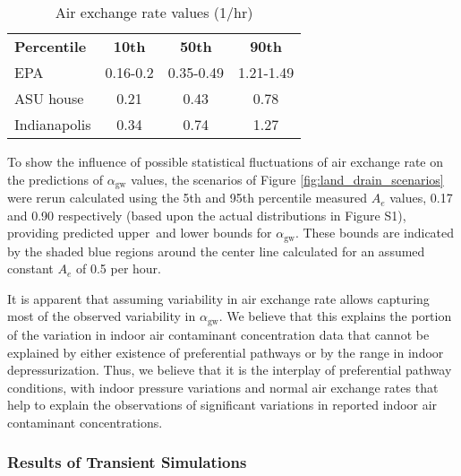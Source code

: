 \documentclass[preprint,12pt]{elsarticle}
\begin{document}
\begin{table}[htb!]
  \centering
  \begin{tabular}{l c c c}
    \toprule
    \textbf{Percentile}                                                     & \textbf{10th} & \textbf{50th} & \textbf{90th} \\
    EPA\cite{u.s._epa_exposure_2011,m._d._koontz_estimation_1995}           & 0.16-0.2      & 0.35-0.49     & 1.21-1.49     \\
    ASU house\cite{holton_temporal_2013,guo_identification_2015}            & 0.21          & 0.43          & 0.78          \\
    Indianapolis\cite{u.s._environmental_protection_agency_assessment_2015} & 0.34          & 0.74          & 1.27          \\
    \bottomrule
  \end{tabular}
  \caption{Air exchange rate values (1/hr)}\label{tbl:air_exchange_rate}
\end{table}

To show the influence of possible statistical fluctuations of air exchange rate on the predictions of $\alpha_\mathrm{gw}$ values, the scenarios of Figure \ref{fig:land_drain_scenarios} were rerun calculated using the 5th and 95th percentile measured $A_e$ values, 0.17 and 0.90 respectively (based upon the actual distributions in Figure S1), providing predicted upper and lower bounds for $\alpha_\mathrm{gw}$.
These bounds are indicated by the shaded blue regions around the center line calculated for an assumed constant $A_e$ of 0.5 per hour.\par

It is apparent that assuming variability in air exchange rate allows capturing most of the observed variability in $\alpha_\mathrm{gw}$.
We believe that this explains the portion of the variation in indoor air contaminant concentration data that cannot be explained by either existence of preferential pathways or by the range in indoor depressurization.
Thus, we believe that it is the interplay of preferential pathway conditions, with indoor pressure variations and normal air exchange rates that help to explain the observations of significant variations in reported indoor air contaminant concentrations.\par

\subsubsection{Results of Transient Simulations}\label{s:results_modeling_transient}
\end{document}
